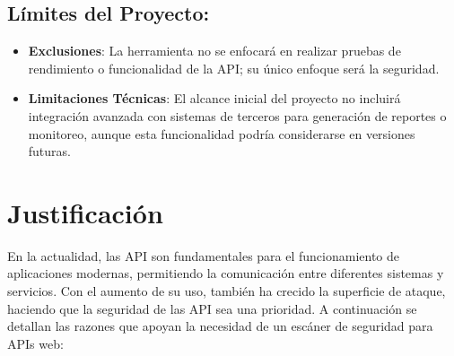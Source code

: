 \documentclass{article}
\begin{document}
    \subsection{Límites del Proyecto:}
    \begin{itemize}
        \item \textbf{Exclusiones}: La herramienta no se enfocará en realizar pruebas de rendimiento o funcionalidad de la API; su único enfoque será la seguridad.
        \item \textbf{Limitaciones Técnicas}: El alcance inicial del proyecto no incluirá integración avanzada con sistemas de terceros para generación de reportes o monitoreo, aunque esta funcionalidad podría considerarse en versiones futuras.
    \end{itemize}

    \section{Justificación}

    En la actualidad, las API son fundamentales para el funcionamiento de aplicaciones modernas, permitiendo la comunicación entre diferentes sistemas y servicios. Con el aumento de su uso, también ha crecido la superficie de ataque, haciendo que la seguridad de las API sea una prioridad. A continuación se detallan las razones que apoyan la necesidad de un escáner de seguridad para APIs web:
\end{document}
